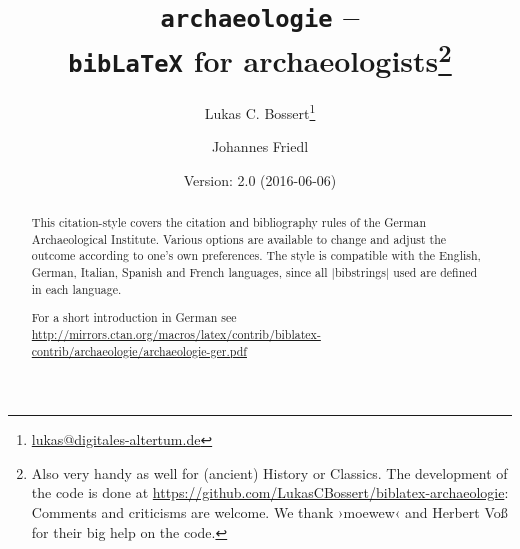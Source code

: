 \documentclass[a4paper,
10pt,
greek,
french,
spanish,
italian,
ngerman,
english
]{ltxdoc}
\begin{document}
\title{\texttt{archaeologie} -- \\\texttt{bib\LaTeX} for archaeologists\footnote{Also very handy as well for (ancient) History or Classics.
The development of the code is done at \url{https://github.com/LukasCBossert/biblatex-archaeologie}: 
Comments and criticisms are welcome.
We thank  ›moewew‹ and Herbert Voß for their big help on the code.%
}}
\author{Lukas C. Bossert\thanks{\href{mailto:lukas@digitales-altertum.de}{lukas@digitales-altertum.de}} \and Johannes Friedl}
\date{Version: 2.0 (2016-06-06)}
 \maketitle
 \begin{abstract}
\noindent This citation-style covers the citation and bibliography rules of the German Archaeological Institute. 
Various options are available to change and adjust the outcome according to one's own preferences. 
The style is compatible with the English, German, Italian, Spanish and French languages, since all |bibstrings| used are defined in each language.

For a short introduction in German see \url{http://mirrors.ctan.org/macros/latex/contrib/biblatex-contrib/archaeologie/archaeologie-ger.pdf}
 \end{abstract}


\begin{multicols}{2}
\footnotesize\parskip=0mm \tableofcontents
\end{multicols}
\end{document}
